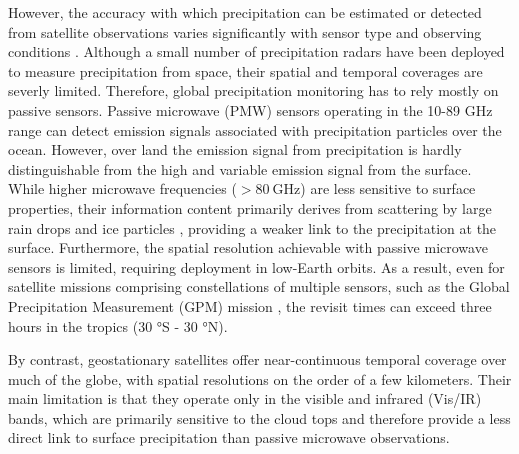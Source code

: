\documentclass[11pt]{article}
\begin{document}
However, the accuracy with which precipitation can be estimated or detected from
satellite observations varies significantly with sensor type and observing
conditions \citep{Stephens2007RemoteSensing}. Although a small number of
precipitation radars have been deployed to measure precipitation from space,
their spatial and temporal coverages are severly limited. Therefore, global
precipitation monitoring has to rely mostly on passive sensors. Passive
microwave (PMW) sensors operating in the 10-89 GHz range can detect emission signals
associated with precipitation particles over the ocean. However, over land the
emission signal from precipitation is hardly distinguishable from the high and
variable emission signal from the surface. While higher microwave frequencies
($> \SI{80}{\giga \hertz}$) are less sensitive to surface properties, their
information content primarily derives from scattering by large rain drops and
ice particles \citep{Bennartz2003Sensitivity}, providing a weaker link to the
precipitation at the surface. Furthermore, the spatial resolution achievable
with passive microwave sensors is limited, requiring deployment in low-Earth
orbits. As a result, even for satellite missions comprising constellations of
multiple sensors, such as the Global Precipitation Measurement (GPM) mission
\citep{Hou2014GPMMission}, the revisit times can exceed three hours in the
tropics (30 °S - 30 °N).

By contrast, geostationary satellites offer near-continuous temporal coverage
over much of the globe, with spatial resolutions on the order of a few
kilometers. Their main limitation is that they operate only in the visible and
infrared (Vis/IR) bands, which are primarily sensitive to the cloud tops and therefore
provide a less direct link to surface precipitation than passive microwave
observations.
\end{document}
